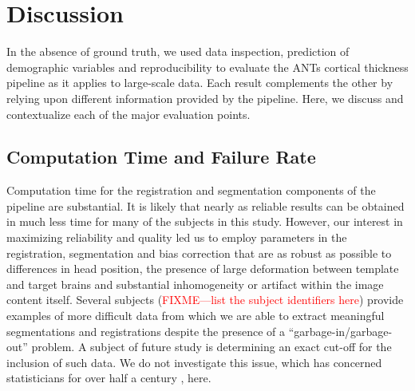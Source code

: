 \section{Discussion}
In the absence of ground truth, we used data inspection, prediction of
demographic variables and reproducibility to evaluate the ANTs
cortical thickness pipeline as it applies to large-scale data.  Each
result complements the other by relying upon different information
provided by the pipeline.  Here, we discuss and contextualize each of
the major evaluation points. 

\subsection{Computation Time and Failure Rate}
Computation time for the registration and segmentation components of
the pipeline are substantial.  It is likely that nearly as reliable
results can be obtained in much less time for many of the subjects in
this study.  However, our interest in
maximizing reliability and quality led us to employ parameters in the
registration, segmentation and bias correction that are as robust as
possible to differences in head position, the presence of large
deformation between template and target brains and substantial
inhomogeneity or artifact within the image content itself.  Several
subjects (\textcolor{red}{FIXME---list the subject identifiers here})
provide examples of more difficult data from which we are able to
extract meaningful segmentations and registrations despite the presence of a
``garbage-in/garbage-out'' problem.  A subject of future study is
determining an exact cut-off for the inclusion of such data.  We do not
investigate this issue, which has concerned statisticians for over
half a century \cite{Hampel2001}, here. 

